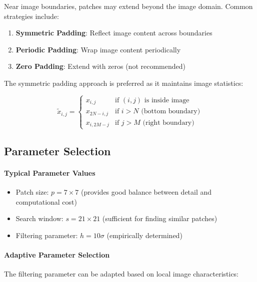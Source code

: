 \documentclass[12pt]{article}
\begin{document}
Near image boundaries, patches may extend beyond the image domain. Common strategies include:

\begin{enumerate}
    \item \textbf{Symmetric Padding}: Reflect image content across boundaries
    \item \textbf{Periodic Padding}: Wrap image content periodically
    \item \textbf{Zero Padding}: Extend with zeros (not recommended)
\end{enumerate}

The symmetric padding approach is preferred as it maintains image statistics:

\begin{equation}
    \tilde{x}_{i,j} = \begin{cases}
        x_{i,j}    & \text{if } (i,j) \text{ is inside image}   \\
        x_{2N-i,j} & \text{if } i > N \text{ (bottom boundary)} \\
        x_{i,2M-j} & \text{if } j > M \text{ (right boundary)}
    \end{cases}
\end{equation}

\subsection{Parameter Selection}
\label{subsec:parameters}

\paragraph{Typical Parameter Values}
\begin{itemize}
    \item Patch size: $p = 7 \times 7$ (provides good balance between detail and computational cost)
    \item Search window: $s = 21 \times 21$ (sufficient for finding similar patches)
    \item Filtering parameter: $h = 10\sigma$ (empirically determined)
\end{itemize}

\paragraph{Adaptive Parameter Selection}
The filtering parameter can be adapted based on local image characteristics:
\end{document}
